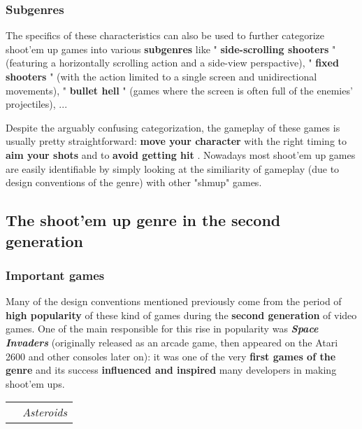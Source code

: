 \documentclass[a4paper,10pt]{book}
\begin{document}
 \subsubsection{Subgenres }
 
 
           The specifics of these characteristics can also be used to further categorize shoot'em up games into various  \textbf{subgenres }  like " \textbf{side-scrolling shooters } " (featuring a horizontally scrolling action and a side-view perspactive),
           " \textbf{fixed shooters } " (with the action limited to a single screen and unidirectional movements), " \textbf{bullet hell } " (games where the screen is often full of the enemies' projectiles), ...  
 
           Despite the arguably confusing categorization, the gameplay of these games is usually pretty straightforward:  \textbf{move your character }  with the right timing to  \textbf{aim your shots }  and to  \textbf{avoid getting hit } .
           Nowadays most shoot'em up games are easily identifiable by simply looking at the similiarity of gameplay (due to design conventions of the genre) with other "shmup" games.
         
 
 \subsection{The shoot'em up genre in the second generation }
 
 \subsubsection{Important games }
 
 
          Many of the design conventions mentioned previously come from the period of  \textbf{high popularity }  of these kind of games during the  \textbf{second generation }  of video games.
          One of the main responsible for this rise in popularity was  \textbf{\textit{Space Invaders }}  (originally released as an arcade game, then appeared on the Atari 2600 and other consoles later on):
          it was one of the very  \textbf{first games of the genre }  and its success  \textbf{influenced and inspired }  many developers in making shoot'em ups.  
 
 
 \begin{longtable}{p{1mm}|l|}\hline
 
 & 
 \\\hline
 
 & \textit{Asteroids }
 \\\hline
 \end{longtable}
 
\end{document}
